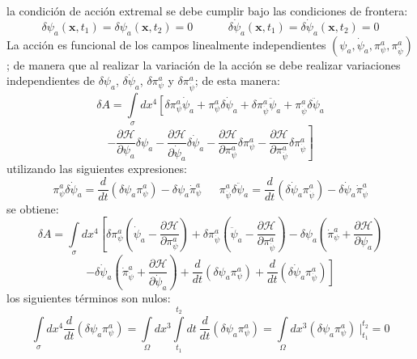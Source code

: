 \documentclass[a4paper,12pt]{article}
\begin{document}
la condición de acción extremal se debe cumplir bajo las condiciones de frontera:
\begin{equation}
\delta \psi_a(\textbf{x},t_1)=\delta \psi_a(\textbf{x},t_2)=0\ \ \ \ \ \ \ \ \ \ \ \ \ \ \delta \dot \psi_a(\textbf{x},t_1)=\delta\dot  \psi_a(\textbf{x},t_2)=0 
\label{fronterascamddd}
\end{equation}
La acción es funcional de los campos linealmente independientes $(\psi_a,\dot\psi_a,\pi^{a}_{\psi},\pi^{a}_{\dot\psi})$; de manera que
al realizar la variación de la acción se debe realizar variaciones independientes de $\delta\psi_a$, $\delta\dot\psi_a$, $\delta\pi^{a}_{\psi}$ y $\delta\pi^{a}_{\dot\psi}$; de esta manera:
\begin{equation}
\delta A=\int\limits_{\sigma}dx^4\left[\delta\pi^{a}_{\psi}\dot\psi_a+\pi^{a}_{\psi}\delta\dot\psi_a+\delta\pi^{a}_{\dot\psi}\ddot\psi_a+\pi^{a}_{\dot\psi}\delta\ddot\psi_a \right.
\end{equation}
$$\left.-\frac{\partial \mathscr{H}}{\partial\psi_a}\delta\psi_a-\frac{\partial \mathscr{H}}{\partial\dot\psi_a}\delta\dot\psi_a-\frac{\partial \mathscr{H}}{\partial\pi^{a}_{\psi}}\delta\pi^{a}_{\psi}-\frac{\partial \mathscr{H}}{\partial\pi^{a}_{\dot\psi}}\delta\pi^{a}_{\dot\psi}\right]$$
utilizando las siguientes expresiones:
\begin{equation}
\pi^{a}_{\psi}\delta\dot\psi_a=\frac{d}{dt}(\delta\psi_a\pi^{a}_{\psi})-\delta\psi_a\dot\pi^{a}_{\psi}\ \ \ \ \ \  \ \pi^{a}_{\dot\psi}\delta\ddot\psi_a=\frac{d}{dt}(\delta\dot\psi_a\pi^{a}_{\dot\psi})-\delta\dot\psi_a\dot\pi^{a}_{\dot\psi} 
\end{equation}
se obtiene:
\begin{equation}
\delta A=\int\limits_{\sigma}dx^4\left[\delta\pi^{a}_{\psi}\left(\dot\psi_a-\frac{\partial \mathscr{H}}{\partial\pi^{a}_{\psi}}\right)+\delta\pi^{a}_{\dot\psi}\left(\ddot\psi_a-\frac{\partial \mathscr{H}}{\partial\pi^{a}_{\dot\psi}}\right)-\delta\psi_a\left(\dot\pi^{a}_{\psi}+\frac{\partial \mathscr{H}}{\partial\psi_a}\right)\right.
\end{equation}
$$-\delta\dot\psi_a\left(\dot\pi^{a}_{\dot\psi}+\frac{\partial \mathscr{H}}{\partial\dot\psi_a}\right)+\left.\frac{d}{dt}(\delta\psi_a\pi^{a}_{\psi})+\frac{d}{dt}(\delta\dot\psi_a\pi^{a}_{\dot\psi})\right] $$
los siguientes términos son nulos:
\begin{equation}
\int\limits_{\sigma}dx^4\frac{d}{dt}(\delta\psi_a\pi^{a}_{\psi})=\int\limits_{\Omega}dx^3\int\limits_{t_1}^{t_2}dt\ \frac{d}{dt}(\delta\psi_a\pi^{a}_{\psi})=\int\limits_{\Omega}dx^3(\delta\psi_a\pi^{a}_{\psi})\ |_{t_1}^{t_2}=0
\end{equation}
\end{document}
